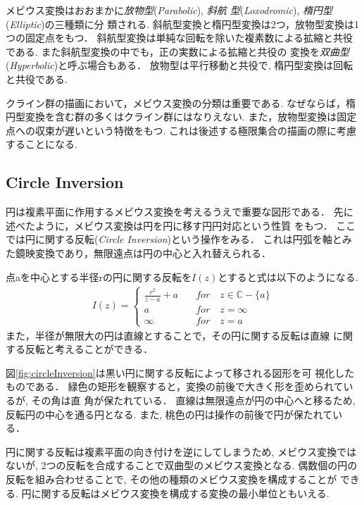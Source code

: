 メビウス変換はおおまかに\emph{放物型}(\textit{Parabolic}), \emph{斜航
型}(\textit{Loxodromic}), \emph{楕円型}(\textit{Elliptic})の三種類に分
類される.
斜航型変換と楕円型変換は2つ，放物型変換は1つの固定点をもつ．
斜航型変換は単純な回転を除いた複素数による拡縮と共役である.
また斜航型変換の中でも，正の実数による拡縮と共役の
変換を\emph{双曲型}(\textit{Hyperbolic})と呼ぶ場合もある．
放物型は平行移動と共役で, 楕円型変換は回転と共役である.

クライン群の描画において，メビウス変換の分類は重要である.
なぜならば，楕円型変換を含む群の多くはクライン群にはなりえない.
また，放物型変換は固定点への収束が遅いという特徴をもつ.
これは後述する極限集合の描画の際に考慮することになる.

\subsection{Circle Inversion}

円は複素平面に作用するメビウス変換を考えるうえで重要な図形である．
先に述べたように，メビウス変換は円を円に移す円円対応という性質
をもつ．
ここでは円に関する反転(\textit{Circle Inversion})という操作をみる．
これは円弧を軸とみた鏡映変換であり，無限遠点は円の中心と入れ替えられる．

点aを中心とする半径rの円に関する反転を$I(z)$とすると式は以下のようになる.
\begin{align*}
I(z) =
 \begin{cases}
  \frac{r^2}{\overline{z - a}} + a \quad &for \quad z \in \mathbb{C} - \{a\} \\
  a \quad &for \quad z = \infty\\
  \infty \quad &for \quad z = a
 \end{cases}
\end{align*}
また，半径が無限大の円は直線とすることで，その円に関する反転は直線
に関する反転と考えることができる．

図\ref{fig:circleInversion}は黒い円に関する反転によって移される図形を可
視化したものである．
緑色の矩形を観察すると，変換の前後で大きく形を歪められているが, その角は直
角が保たれている．
直線は無限遠点が円の中心へと移るため, 反転円の中心を通る円となる.
また, 桃色の円は操作の前後で円が保たれている．

円に関する反転は複素平面の向き付けを逆にしてしまうため, メビウス変換では
ないが, 2つの反転を合成することで双曲型のメビウス変換となる.
偶数個の円の反転を組み合わせることで, その他の種類のメビウス変換を構成することが
できる.
円に関する反転はメビウス変換を構成する変換の最小単位ともいえる.

